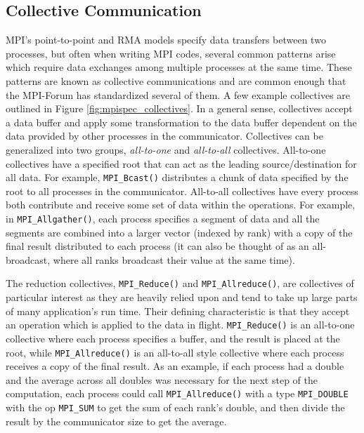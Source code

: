 \subsection{Collective Communication}
\gls{MPI}'s point-to-point and \gls{RMA} models specify data transfers between two processes, but often when writing \gls{MPI} codes, several common patterns arise which require data exchanges among multiple processes at the same time.
These patterns are known as collective communications and are common enough that the MPI-Forum has standardized several of them.
A few example collectives are outlined in Figure \ref{fig:mpispec_collectives}. 
In a general sense, collectives accept a data buffer and apply some transformation to the data buffer dependent on the data provided by other processes in the communicator.
Collectives can be generalized into two groups, \textit{all-to-one} and \textit{all-to-all} collectives.
All-to-one collectives have a specified root that can act as the leading source/destination for all data.
For example, \texttt{MPI\_Bcast()} distributes a chunk of data specified by the root to all processes in the communicator.
All-to-all collectives have every process both contribute and receive some set of data within the operations.
For example, in \texttt{MPI\_Allgather()}, each process specifies a segment of data and all the segments are combined into a larger vector (indexed by rank) with a copy of the final result distributed to each process (it can also be thought of as an all-broadcast, where all ranks broadcast their value at the same time).



The reduction collectives, \texttt{MPI\_Reduce()} and \texttt{MPI\_Allreduce()}, are collectives of particular interest as they are heavily relied upon and tend to take up large parts of many application's run time.
Their defining characteristic is that they accept an operation which is applied to the data in flight.
\texttt{MPI\_Reduce()} is an all-to-one collective where each process specifies a buffer, and the result is placed at the root, while \texttt{MPI\_Allreduce()} is an all-to-all style collective where each process receives a copy of the final result. 
As an example, if each process had a double and the average across all doubles was necessary for the next step of the computation, each process could call \texttt{MPI\_Allreduce()} with a type \texttt{MPI\_DOUBLE} with the op \texttt{MPI\_SUM} to get the sum of each rank's double, and then divide the result by the communicator size to get the average.

